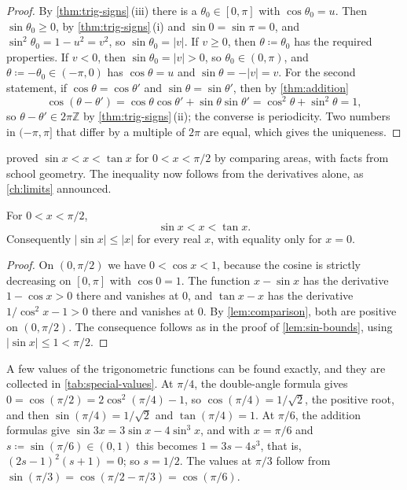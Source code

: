 \begin{proof}
By \cref{thm:trig-signs}\,(iii) there is a $\theta_0\in[0,\pi]$ with $\cos\theta_0=u$. Then $\sin\theta_0\ge0$, by \cref{thm:trig-signs}\,(i) and $\sin0=\sin\pi=0$, and $\sin^2\theta_0=1-u^2=v^2$, so $\sin\theta_0=|v|$. If $v\ge0$, then $\theta\coloneqq\theta_0$ has the required properties. If $v<0$, then $\sin\theta_0=|v|>0$, so $\theta_0\in(0,\pi)$, and $\theta\coloneqq-\theta_0\in(-\pi,0)$ has $\cos\theta=u$ and $\sin\theta=-|v|=v$. For the second statement, if $\cos\theta=\cos\theta'$ and $\sin\theta=\sin\theta'$, then by \cref{thm:addition}
\[
\cos(\theta-\theta')=\cos\theta\cos\theta'+\sin\theta\sin\theta'=\cos^2\theta+\sin^2\theta=1 ,
\]
so $\theta-\theta'\in2\pi\mathbb Z$ by \cref{thm:trig-signs}\,(ii); the converse is periodicity. Two numbers in $(-\pi,\pi]$ that differ by a multiple of $2\pi$ are equal, which gives the uniqueness.
\end{proof}

 proved $\sin x<x<\tan x$ for $0<x<\pi/2$ by comparing areas, with facts from school geometry. The inequality now follows from the derivatives alone, as \cref{ch:limits} announced.

\begin{proposition}
\label{prop:sin-x-tan}
For $0<x<\pi/2$,
\[
\sin x<x<\tan x .
\]
Consequently $|\sin x|\le|x|$ for every real $x$, with equality only for $x=0$.
\end{proposition}

\begin{proof}
On $(0,\pi/2)$ we have $0<\cos x<1$, because the cosine is strictly decreasing on $[0,\pi]$ with $\cos0=1$. The function $x-\sin x$ has the derivative $1-\cos x>0$ there and vanishes at $0$, and $\tan x-x$ has the derivative $1/\cos^2x-1>0$ there and vanishes at $0$. By \cref{lem:comparison}, both are positive on $(0,\pi/2)$. The consequence follows as in the proof of \cref{lem:sin-bounds}, using $|\sin x|\le1<\pi/2$.
\end{proof}

A few values of the trigonometric functions can be found exactly, and they are collected in \cref{tab:special-values}. At $\pi/4$, the double-angle formula gives $0=\cos(\pi/2)=2\cos^2(\pi/4)-1$, so $\cos(\pi/4)=1/\sqrt2$, the positive root, and then $\sin(\pi/4)=1/\sqrt2$ and $\tan(\pi/4)=1$. At $\pi/6$, the addition formulas give $\sin3x=3\sin x-4\sin^3x$, and with $x=\pi/6$ and $s\coloneqq\sin(\pi/6)\in(0,1)$ this becomes $1=3s-4s^3$, that is, $(2s-1)^2(s+1)=0$; so $s=1/2$. The values at $\pi/3$ follow from $\sin(\pi/3)=\cos(\pi/2-\pi/3)=\cos(\pi/6)$.

